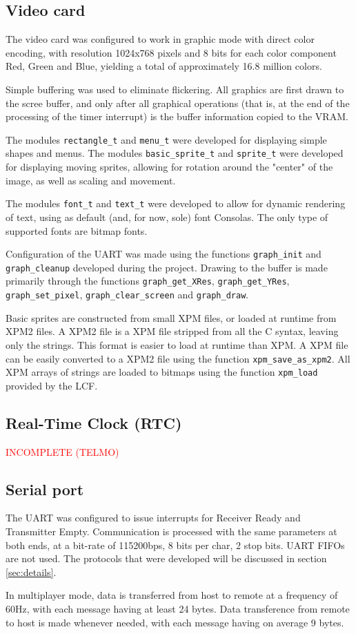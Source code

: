 \documentclass{article}
\theoremstyle{remark}
\begin{document}
\subsection{Video card}
The video card was configured to work in graphic mode with direct color encoding, with resolution 1024x768 pixels and 8 bits for each color component Red, Green and Blue, yielding a total of approximately 16.8 million colors. \par
Simple buffering was used to eliminate flickering. All graphics are first drawn to the scree buffer, and only after all graphical operations (that is, at the end of the processing of the timer interrupt) is the buffer information copied to the VRAM. \par
The modules \texttt{rectangle\_t} and \texttt{menu\_t} were developed for displaying simple shapes and menus. The modules \texttt{basic\_sprite\_t} and \texttt{sprite\_t} were developed for displaying moving sprites, allowing for rotation around the "center" of the image, as well as scaling and movement. \par
The modules \texttt{font\_t} and \texttt{text\_t} were developed to allow for dynamic rendering of text, using as default (and, for now, sole) font Consolas. The only type of supported fonts are bitmap fonts. \par
Configuration of the UART was made using the functions \texttt{graph\_init} and \texttt{graph\_cleanup} developed during the project. Drawing to the buffer is made primarily through the functions \texttt{graph\_get\_XRes}, \linebreak \texttt{graph\_get\_YRes}, \texttt{graph\_set\_pixel}, \texttt{graph\_clear\_screen} and \texttt{graph\_draw}.\par
Basic sprites are constructed from small XPM files, or loaded at runtime from XPM2 files. A XPM2 file is a XPM file stripped from all the C syntax, leaving only the strings. This format is easier to load at runtime than XPM. A XPM file can be easily converted to a XPM2 file using the function \texttt{xpm\_save\_as\_xpm2}. All XPM arrays of strings are loaded to bitmaps using the function \texttt{xpm\_load} provided by the LCF.
\subsection{Real-Time Clock (RTC)}
\textcolor{red}{INCOMPLETE (TELMO)}
\subsection{Serial port}
The UART was configured to issue interrupts for Receiver Ready and Transmitter Empty. Communication is processed with the same parameters at both ends, at a bit-rate of 115200bps, 8 bits per char, 2 stop bits. UART FIFOs are not used. The protocols that were developed will be discussed in section \ref{sec:details}. \par
In multiplayer mode, data is transferred from host to remote at a frequency of 60Hz, with each message having at least 24 bytes. Data transference from remote to host is made whenever needed, with each message having on average 9 bytes.
\pagebreak
\end{document}
